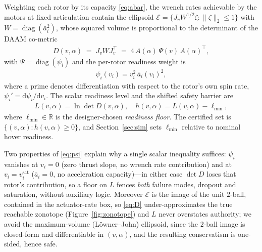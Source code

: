 \documentclass[letter, 10 pt, journal, twoside]{IEEEtran}
\theoremstyle{compact}
\newcommand{\diag}{\operatorname{diag}}
\begin{document}
Weighting each rotor by its capacity \eqref{eq:abar}, the wrench rates achievable by the motors at
fixed articulation contain the ellipsoid $\mathcal{E}=\{J_v W^{1/2}\zeta:\|\zeta\|_2\le1\}$ with $W=\diag(\bar a_i^2)$, whose squared volume is proportional to the determinant of the \ac{DAAM} co-metric
%
\begin{align}
    D(v,\alpha) \;=\; J_v W J_v^{\!\top} \;=\; 4\,A(\alpha)\,\Psi(v)\,A(\alpha)^{\!\top},
    \label{eq:D}
\end{align}
%
with $\Psi=\diag(\psi_i)$ and the per-rotor readiness weight is
%
\begin{align}
    \psi_i(v_i) = v_i^2\,\bar a_i(v_i)^2 ,
    \label{eq:psi}
\end{align}
%
where a prime denotes differentiation with respect to the rotor's own spin rate, $\psi_i'=\mathrm{d}\psi_i/\mathrm{d}v_i$. The scalar readiness level and the shifted safety barrier are
%
\begin{align}
    L(v,\alpha) = \ln\det D(v,\alpha),
    \quad
    h(v,\alpha) = L(v,\alpha) - \ell_{\min},
    \label{eq:L}
\end{align}
%
where $\ell_{\min}\in\mathbb{R}$ is the designer-chosen \emph{readiness floor}. %
The certified set is $\{(v,\alpha): h(v,\alpha)\ge0\}$, and Section~\ref{sec:sim} sets $\ell_{\min}$ relative to nominal hover readiness.
 
Two properties of \eqref{eq:psi} explain why a single scalar inequality suffices: $\psi_i$ vanishes at $v_i=0$ (zero thrust slope, no wrench rate contribution) and at $v_i=v_i^{\mathrm{sat}}$ ($\bar a_i=0$, no acceleration capacity)---in either case $\det D$ loses that rotor's contribution, so a floor on $L$ fences \emph{both} failure modes, dropout and saturation, without auxiliary logic. Moreover $\mathcal{E}$ is the image of the unit $2$-ball, contained in the actuator-rate box, so \eqref{eq:D} under-approximates the true reachable zonotope (Figure~\ref{fig:zonotope}) and $L$ never overstates authority; we avoid the maximum-volume (L\"owner--John) ellipsoid, since the $2$-ball image is closed-form and differentiable in $(v,\alpha)$, and the resulting conservatism is one-sided, hence safe.
\end{document}
